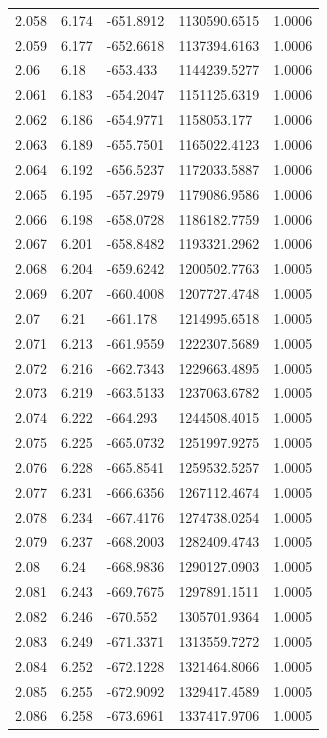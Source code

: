 \begin{tabular}{lllll}
2.058 & 6.174 & -651.8912 & 1130590.6515 & 1.0006 \\
2.059 & 6.177 & -652.6618 & 1137394.6163 & 1.0006 \\
2.06 & 6.18 & -653.433 & 1144239.5277 & 1.0006 \\
2.061 & 6.183 & -654.2047 & 1151125.6319 & 1.0006 \\
2.062 & 6.186 & -654.9771 & 1158053.177 & 1.0006 \\
2.063 & 6.189 & -655.7501 & 1165022.4123 & 1.0006 \\
2.064 & 6.192 & -656.5237 & 1172033.5887 & 1.0006 \\
2.065 & 6.195 & -657.2979 & 1179086.9586 & 1.0006 \\
2.066 & 6.198 & -658.0728 & 1186182.7759 & 1.0006 \\
2.067 & 6.201 & -658.8482 & 1193321.2962 & 1.0006 \\
2.068 & 6.204 & -659.6242 & 1200502.7763 & 1.0005 \\
2.069 & 6.207 & -660.4008 & 1207727.4748 & 1.0005 \\
2.07 & 6.21 & -661.178 & 1214995.6518 & 1.0005 \\
2.071 & 6.213 & -661.9559 & 1222307.5689 & 1.0005 \\
2.072 & 6.216 & -662.7343 & 1229663.4895 & 1.0005 \\
2.073 & 6.219 & -663.5133 & 1237063.6782 & 1.0005 \\
2.074 & 6.222 & -664.293 & 1244508.4015 & 1.0005 \\
2.075 & 6.225 & -665.0732 & 1251997.9275 & 1.0005 \\
2.076 & 6.228 & -665.8541 & 1259532.5257 & 1.0005 \\
2.077 & 6.231 & -666.6356 & 1267112.4674 & 1.0005 \\
2.078 & 6.234 & -667.4176 & 1274738.0254 & 1.0005 \\
2.079 & 6.237 & -668.2003 & 1282409.4743 & 1.0005 \\
2.08 & 6.24 & -668.9836 & 1290127.0903 & 1.0005 \\
2.081 & 6.243 & -669.7675 & 1297891.1511 & 1.0005 \\
2.082 & 6.246 & -670.552 & 1305701.9364 & 1.0005 \\
2.083 & 6.249 & -671.3371 & 1313559.7272 & 1.0005 \\
2.084 & 6.252 & -672.1228 & 1321464.8066 & 1.0005 \\
2.085 & 6.255 & -672.9092 & 1329417.4589 & 1.0005 \\
2.086 & 6.258 & -673.6961 & 1337417.9706 & 1.0005 \\

\end{tabular}
